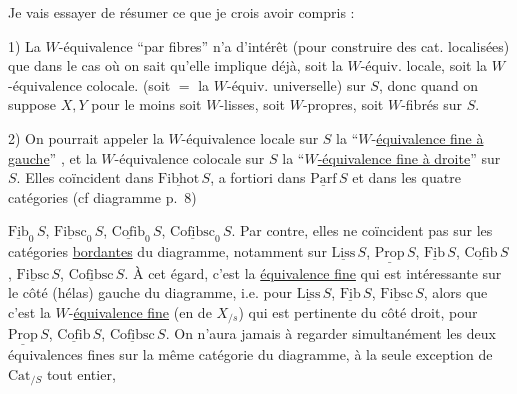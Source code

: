 Je vais essayer de résumer ce que je crois avoir compris :

1) La $W$-équivalence ``par fibres'' n'a d'intérêt  (pour construire des cat. localisées) que dans le cas où on sait qu'elle implique déjà, soit la $W$-équiv. locale, soit la $W$-équivalence colocale. (soit $=$ la $W$-équiv. universelle) sur $S$, donc quand on suppose $X,Y$ pour le moins  soit $W$-lisses, soit $W$-propres, soit $W$-fibrés sur $S$.

2) On pourrait appeler la $W$-équivalence locale sur $S$ la ``$W$-\uline{équivalence fine à gauche}'' , et la $W$-équivalence colocale sur $S$ la ``\uline{$W$-équivalence fine à droite}'' sur $S$. Elles coïncident dans $\underline{\mathrm{Fibhot}}\,S$, a fortiori dans $\underline{\mathrm{Parf}}\,S$  et dans les quatre catégories (cf diagramme p.~8)


$\underline{\mathrm{Fib}}_0\,S$, $\underline{\mathrm{Fibsc}}_0\,S$, $\underline{\mathrm{Cofib}}_0\,S$, $\underline{\mathrm{Cofibsc}}_0\,S$. Par contre, elles ne coïncident pas sur les catégories \uline{bordantes} du diagramme, notamment sur $\underline{\mathrm{Liss}}\,S$, $\underline{\mathrm{Prop}}\,S$, $\underline{\mathrm{Fib}}\,S$, $\underline{\mathrm{Cofib}}\,S$, $\underline{\mathrm{Fibsc}}\,S$, $\underline{\mathrm{Cofibsc}}\,S$. À cet égard, c'est la \uline{équivalence fine}   qui est intéressante sur le côté (hélas) gauche du diagramme, i.e. pour $\underline{\mathrm{Liss}}\,S$, $\underline{\mathrm{Fib}}\,S$, $\underline{\mathrm{Fibsc}}\,S$, alors que c'est la $W$-\uline{équivalence fine}  (en  de $X_{/s}$) qui est pertinente du côté droit, pour $\underline{\mathrm{Prop}}\,S$, $\underline{\mathrm{Cofib}}\,S$, $\underline{\mathrm{Cofibsc}}\,S$. On n'aura jamais à  regarder simultanément les deux équivalences fines sur la  même catégorie du diagramme, à la seule exception de $\mathrm{Cat}_{/S}$ tout entier,

